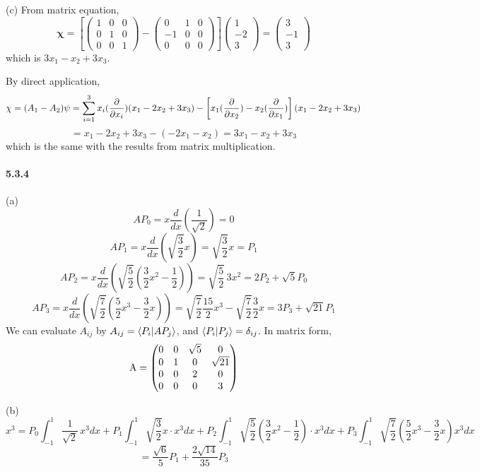 \documentclass[a4paper]{article}
\begin{document}
(c) From matrix equation, 
\[
\boldsymbol{\chi}=\left[
\begin{pmatrix}
1&0&0\\
0&1&0\\
0&0&1
\end{pmatrix}
-
\begin{pmatrix}
0&1&0\\
-1&0&0\\
0&0&0
\end{pmatrix}
\right]
\begin{pmatrix}
1\\-2\\3
\end{pmatrix}=
\begin{pmatrix}
3\\-1\\3
\end{pmatrix}
\]
which is $3x_1-x_2+3x_3$.

By direct application,
\[
\chi=(A_1-A_2)\psi=\sum_{i=1}^3x_i(\frac{\partial}{\partial x_i})(x_1-2x_2+3x_3)-\left[x_1(\frac{\partial}{\partial x_2})-x_2(\frac{\partial}{\partial x_1}) \right](x_1-2x_2+3x_3)
\]
\[
=x_1-2x_2+3x_3-(-2x_1-x_2)=3x_1-x_2+3x_3
\]
which is the same with the results from matrix multiplication.

\paragraph{5.3.4}
(a)
\[
AP_0=x\frac{d}{dx}(\frac{1}{\sqrt{2}})=0
\]
\[
AP_1=x\frac{d}{dx}(\sqrt{\frac{3}{2}}x)=\sqrt{\frac{3}{2}}x=P_1
\]
\[
AP_2=x\frac{d}{dx}\left(\sqrt{\frac{5}{2}}(\frac{3}{2}x^2-\frac{1}{2})\right)=\sqrt{\frac{5}{2}}\,3x^2=2P_2+\sqrt{5}P_0
\]
\[
AP_3=x\frac{d}{dx}\left(\sqrt{\frac{7}{2}}(\frac{5}{2}x^3-\frac{3}{2}x)\right)=\sqrt{\frac{7}{2}}\frac{15}{2}x^3-\sqrt{\frac{7}{2}}\frac{3}{2}x=3P_3+\sqrt{21}P_1
\]
We can evaluate $A_{ij}$ by $A_{ij}=\langle P_i|AP_j\rangle$, and $\langle P_i|P_j\rangle=\delta_{ij}$. In matrix form,
\[
\mathrm{A}=
\begin{pmatrix}
0&0&\sqrt{5}&0\\
0&1&0&\sqrt{21}\\
0&0&2&0\\
0&0&0&3
\end{pmatrix}
\]

(b)
\[
x^3=P_0\int_{-1}^1\frac{1}{\sqrt{2}}\,x^3dx+P_1\int_{-1}^1\sqrt{\frac{3}{2}}x\cdot x^3dx+P_2\int_{-1}^1\sqrt{\frac{5}{2}}(\frac{3}{2}x^2-\frac{1}{2})\cdot x^3dx+P_3\int_{-1}^1\sqrt{\frac{7}{2}}(\frac{5}{2}x^3-\frac{3}{2}x)x^3dx\]
\[=\frac{\sqrt{6}}{5}P_1+\frac{2\sqrt{14}}{35}P_3
\]
\end{document}
